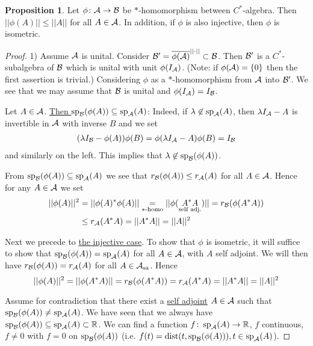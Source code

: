 \documentclass[10pt,english,a4paper]{article}
\theoremstyle{definition}
\newtheorem*{proposition}{Proposition}
\def\sa{\text{sa}}
\DeclareMathOperator{\Sp}{sp}
\begin{document}
\begin{proposition}
    Let $\phi \colon \mathcal{A}\to\mathcal{B}$ be $*$-homomorphism between $C^*$-algebra. 
Then $||\phi(A)|| \leq ||A||$ for all $A \in \mathcal{A}$. In addition, 
if $\phi$ is also injective, then $\phi$ is isometric.
\end{proposition}
\begin{proof}
    1) Assume $\mathcal{A}$ is unital. Consider $\mathcal{B}' = \overline{\phi(\mathcal{A})}^{||\cdot||} \subset \mathcal{B}$.
    Then $\mathcal{B}'$ is a $C^*$-subalgebra of $\mathcal{B}$ which is unital with unit $\phi(I_{\mathcal{A}})$.
    (Note: if $\phi(\mathcal{A})  = \{0\}$ then the first assertion is trivial.) Considering 
    $\phi$ as a $*$-homomorphism from $\mathcal{A}$ into $\mathcal{B}'$. We see that we may assume that 
$\mathcal{B}$ is unital and $\phi(I_{\mathcal{A}}) = I_{\mathcal{B}}$. 

Let $A \in \mathcal{A}$. \ul{Then $\Sp_{\Bs}(\phi(A))\subseteq \Sp_{\As}(A)$}:
Indeed, if $\la \not\in \Sp_{\As}(A)$, then $\lambda I_{\mathcal{A}} - A$ is invertible in 
$\mathcal{A}$ with inverse $B$ and we set 
\begin{align*}
    (\lambda I_{\mathcal{B}} - \phi(A) )\phi(B) = \phi(\lambda I_{\mathcal{A}} - A)\phi(B) = I_{\mathcal{B}}
\end{align*}
and similarly on the left. This implies that $\la \not \in \Sp_{\Bs}(\phi(A))$.
 
From $\Sp_{\Bs}(\phi(A))\subseteq \Sp_{\As}(A)$ we see that 
$r_{\mathcal{B}} (\phi(A)) \leq r_{\mathcal{A}}(A)$ for all $A \in \mathcal{A}$. Hence for any $A \in \mathcal{A}$
we set 
\begin{align*}
    ||\phi(A)||^2 &= ||\phi(A)^*\phi(A)|| \underset{*\text{-homo}}{=}
    ||\phi(\underset{\text{self adj.}}{A^*A})|| = r_{\mathcal{B}}(\phi(A^*A)) \\
    &\leq r_{\mathcal{A}}(A^*A) = ||A^*A|| = ||A||^2
\end{align*}

Next we precede to \ul{the injective case}. To show that $\phi$ is isometric, it will 
suffice to show that $\Sp_{\Bs}(\phi(A)) = \Sp_{\As}(A)$ for all $A \in \mathcal{A}$, with $A$ self adjoint.
We will then have $r_{\mathcal{B}}(\phi(A)) = r_{\mathcal{A}}(A)$ for all $A \in \As_{\sa}$. Hence 
\[||\phi(A)||^2 = ||\phi(A^*A)|| = r_{\mathcal{B}}(\phi(A^*A)) = r_{\mathcal{A}}(A^*A) 
= ||A^*A|| = ||A||^2 \]

Assume for contradiction that there exist a \ul{self adjoint} $A \in \mathcal{A}$ such that 
$\Sp_{\Bs}(\phi(A)) \neq \Sp_{\As}(A)$. We have seen that we always have 
$\Sp_{\Bs}(\phi(A)) \subseteq \Sp_{\As}(A) \subset \R$. 
We can find a function $f \colon \Sp_{\As}(A) \to \R$, $f$ continuous, $f \neq 0$
with $f=0$ on $\Sp_{\Bs}(\phi(A))$ (i.e. $f(t) = \text{dist}(t, \Sp_{\Bs}(\phi(A))), t \in \Sp_{\As}(A)$).


\end{proof}
\end{document}
